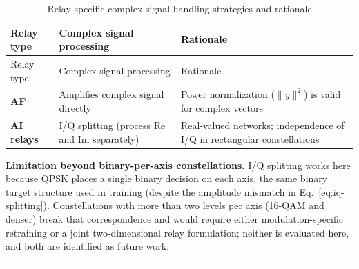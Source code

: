 \begin{longtable}[]{@{}
  >{\raggedright\arraybackslash}p{}
  >{\raggedright\arraybackslash}p{}
  >{\raggedright\arraybackslash}p{}@{}}
\caption[Relay-specific complex-signal handling]{Relay-specific complex signal handling strategies and rationale}\label{tbl:table31}\tabularnewline
\toprule\noalign{}
\begin{minipage}[b]{\linewidth}\raggedright
Relay type
\end{minipage} & \begin{minipage}[b]{\linewidth}\raggedright
Complex signal processing
\end{minipage} & \begin{minipage}[b]{\linewidth}\raggedright
Rationale
\end{minipage} \\
\midrule\noalign{}
\endfirsthead
\toprule\noalign{}
\begin{minipage}[b]{\linewidth}\raggedright
Relay type
\end{minipage} & \begin{minipage}[b]{\linewidth}\raggedright
Complex signal processing
\end{minipage} & \begin{minipage}[b]{\linewidth}\raggedright
Rationale
\end{minipage} \\
\midrule\noalign{}
\endhead
\bottomrule\noalign{}
\endlastfoot
\textbf{AF} & Amplifies complex signal directly & Power normalization (\(\|y\|^2\)) is valid for complex vectors \\
\textbf{AI relays} & I/Q splitting (process Re and Im separately) & Real-valued networks; independence of I/Q in rectangular constellations \\
\end{longtable}

\textbf{Limitation beyond binary-per-axis constellations.} I/Q splitting works here because QPSK places a single binary decision on each axis, the same binary target structure used in training (despite the amplitude mismatch in Eq.~\eqref{eq:iq-splitting}). Constellations with more than two levels per axis (16-QAM and denser) break that correspondence and would require either modulation-specific retraining or a joint two-dimensional relay formulation; neither is evaluated here, and both are identified as future work.

\begin{center}\rule{0.5\linewidth}{0.5pt}\end{center}
